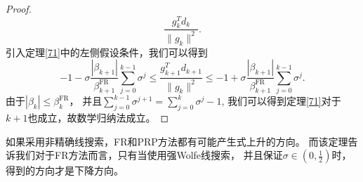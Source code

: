\begin{proof}
\begin{equation}
                \displaystyle\frac{g_{k}^Td_k}{\|g_{k}\|^2}.
            \nonumber
            \end{equation}
            引入定理\ref{71}中的左侧假设条件，我们可以得到
            \begin{equation}
                -1 - \sigma \displaystyle\frac{|\beta_{k+1}|}{\beta_{k+1}^{\mathrm {FR}}}
                \displaystyle\sum^{k-1}_{j=0}\sigma^j
                \leq
                \displaystyle\frac{g_{k+1}^Td_{k+1}}{\|g_{k}\|^2}
                \leq
                -1 + \sigma \displaystyle\frac{|\beta_{k+1}|}{\beta_{k+1}^{\mathrm {FR}}}
                \displaystyle\sum^{k-1}_{j=0}\sigma^j.
            \nonumber
            \end{equation}
            由于$|\beta_k| \leq \beta_k^{\mathrm {FR}}$，
            并且$\displaystyle\sum^{k-1}_{j=0}\sigma^{j+1} = \displaystyle\sum^{k}_{j=0}\sigma^{j} - 1 $,
            我们可以得到定理\ref{71}对于$k+1$也成立，故数学归纳法成立。
        \end{proof}
        
            如果采用非精确线搜索，FR和PRP方法都有可能产生式上升的方向。
            而该定理告诉我们对于FR方法而言，只有当使用强Wolfe线搜索，
            并且保证$\sigma\in(0,\frac{1}{2})$时，得到的方向才是下降方向。
            
